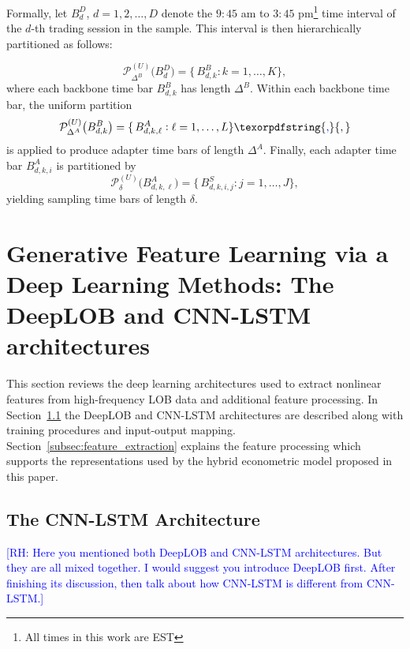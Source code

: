 \documentclass[10pt,a4paper,oneside]{article}
\newcommand{\rh}[1]{\textcolor{blue}{\textsf{[RH: #1]}}}
\providecommand{\DIFaddtex}[1]{{\protect\color{blue} \sf #1}} %
\providecommand{\DIFdeltex}[1]{{\protect\color{red} \scriptsize #1}} %
\providecommand{\DIFaddbegin}{} %
\providecommand{\DIFaddend}{} %
\providecommand{\DIFdelbegin}{} %
\providecommand{\DIFadd}[1]{\texorpdfstring{\DIFaddtex{#1}}{#1}} %
\providecommand{\DIFdel}[1]{\texorpdfstring{\DIFdeltex{#1}}{}} %
\newcommand{\DIFscaledelfig}{0.5}
\newlength{\DIFdelgraphicswidth} %
\newlength{\DIFdelgraphicsheight} %
\newcommand{\DIFaddincludegraphics}[2][]{{\color{blue}\fbox{\DIFOincludegraphics[#1]{#2}}}} %
\newcommand{\DIFdelincludegraphics}[2][]{%
\sbox{\DIFdelgraphicsbox}{\DIFOincludegraphics[#1]{#2}}%
\settoboxwidth{\DIFdelgraphicswidth}{\DIFdelgraphicsbox} %
\settoboxtotalheight{\DIFdelgraphicsheight}{\DIFdelgraphicsbox} %
\scalebox{\DIFscaledelfig}{%
\parbox[b]{\DIFdelgraphicswidth}{\usebox{\DIFdelgraphicsbox}\\[-\baselineskip] \rule{\DIFdelgraphicswidth}{0em}}\llap{\resizebox{\DIFdelgraphicswidth}{\DIFdelgraphicsheight}{%
\setlength{\unitlength}{\DIFdelgraphicswidth}%
\begin{picture}(1,1)%
\thicklines\linethickness{2pt} %
{\color[rgb]{1,0,0}\put(0,0){\framebox(1,1){}}}%
{\color[rgb]{1,0,0}\put(0,0){\line( 1,1){1}}}%
{\color[rgb]{1,0,0}\put(0,1){\line(1,-1){1}}}%
\end{picture}%
}\hspace*{3pt}}} %
} %
\DeclareRobustCommand{\DIFaddbegin}{\DIFOaddbegin \let\includegraphics\DIFaddincludegraphics} %
\DeclareRobustCommand{\DIFaddend}{\DIFOaddend \let\includegraphics\DIFOincludegraphics} %
\DeclareRobustCommand{\DIFdelbegin}{\DIFOdelbegin \let\includegraphics\DIFdelincludegraphics} %
\begin{document}
Formally, let $B^D_d$, $d = 1, 2, \dots, D$ denote the $9:45$ am to $3:45$ pm\footnote{All times in this work are EST} time interval of the $d$-th trading session in the sample. This interval is then hierarchically partitioned as follows:

\[
    \mathcal P^{(U)}_{\Delta^B}\bigl(B^D_d\bigr)
    =\{\,B^B_{d,k}:k=1,\dots,K\},
\]
where each backbone time bar \(B^B_{d,k}\) has length \(\Delta^B\).  Within each backbone time bar, the uniform partition
\[
    \mathcal P^{(U)}_{\Delta^A}\bigl(B^B_{d,k}\bigr)
    =\{\,B^A_{d,k,\ell}:\ell=1,\dots,L\}\DIFaddbegin \DIFadd{,
}\DIFaddend \]
is applied to produce adapter time bars of length \(\Delta^A\).  Finally, each adapter time bar \(B^A_{d,k,i}\) is partitioned by
\[
    \mathcal P^{(U)}_{\delta}\bigl(B^A_{d,k,\ell}\bigr)
    =\{\,B^S_{d,k,i,j}:j=1,\dots,J\},
\]
yielding sampling time bars of length \(\delta\).

\section{Generative Feature Learning via a Deep Learning Methods: The DeepLOB and CNN-LSTM architectures}
\label{Sect:Features}
This section reviews the deep learning architectures used to extract nonlinear features from high-frequency LOB data and additional feature processing. In Section~\ref{subsec:cnn_lstm} the DeepLOB \cite{zhang2021deeplearningmarketorder} and CNN-LSTM architectures \cite{kolm2023deep} are described along with training procedures and input-output mapping. Section~\ref{subsec:feature_extraction} explains the feature processing which supports the representations used by the hybrid econometric model proposed in this paper.
\subsection{The CNN-LSTM Architecture}
\label{subsec:cnn_lstm}
\DIFdelbegin \DIFdel{\rh{Here you mentioned both DeepLOB and CNN-LSTM architectures. But they are all mixed together. I would suggest you introduce DeepLOB first. After finishing its discussion, then talk about how CNN-LSTM is different from CNN-LSTM.}
}%
\end{document}
